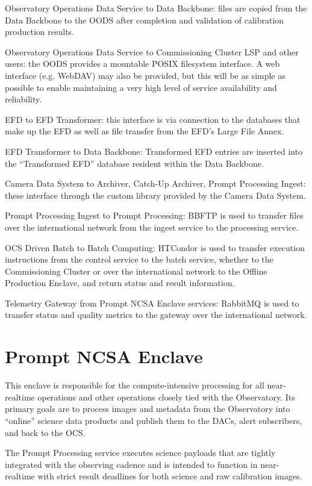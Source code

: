 \documentclass[DM,toc]{lsstdoc}
\begin{document}
Observatory Operations Data Service to Data Backbone: files are copied from the Data Backbone to the OODS after completion and validation of calibration production results.

Observatory Operations Data Service to Commissioning Cluster LSP and other users: the OODS provides a mountable POSIX filesystem interface.
A web interface (e.g. WebDAV) may also be provided, but this will be as simple as possible to enable maintaining a very high level of service availability and reliability.

EFD to EFD Transformer: this interface is via connection to the
databases that make up the EFD as well as file transfer from the EFD's
Large File Annex.

EFD Transformer to Data Backbone: Transformed EFD entries are inserted
into the ``Transformed EFD'' database resident within the Data Backbone.

Camera Data System to Archiver, Catch-Up Archiver, Prompt Processing
Ingest: these interface through the custom library provided by the
Camera Data System.

Prompt Processing Ingest to Prompt Processing: BBFTP is used to transfer
files over the international network from the ingest service to the
processing service.

OCS Driven Batch to Batch Computing: HTCondor is
used to transfer execution instructions
from the control service to the batch service, whether to the Commissioning Cluster or over the international network to the Offline Production Enclave, and return status and
result information.

Telemetry Gateway from Prompt NCSA Enclave services: RabbitMQ is
used to transfer status and quality metrics to the gateway over the
international network.

\section{Prompt NCSA Enclave}\label{prompt-ncsa-enclave}

This enclave is responsible for the compute-intensive processing for all
near-realtime operations and other operations closely tied with the
Observatory. Its primary goals are to process images and metadata from
the Observatory into ``online'' science data products and publish them
to the DACs, alert subscribers, and back to the OCS.

The Prompt Processing service executes science payloads that are tightly integrated with the observing cadence and is intended to function in near-realtime with strict result deadlines for both science and raw calibration images.
\end{document}
